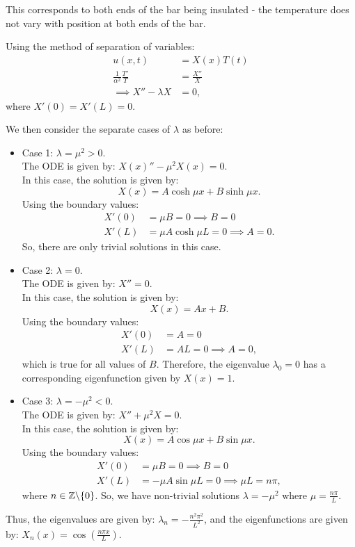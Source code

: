 This corresponds to both ends of the bar being insulated - the temperature does not vary with position at both ends of the bar.

Using the method of separation of variables:
\begin{align*}
	u(x,t) &= X(x) T(t) \\
	\frac{1}{\alpha^2} \frac{T'}{T} &= \frac{X''}{X} \\
	\implies X'' - \lambda X &= 0,
\end{align*}
where $X'(0) = X'(L) = 0$.

We then consider the separate cases of $\lambda$ as before:
\begin{itemize}
	\item Case 1: $\lambda = \mu^2 > 0$.\\
	The ODE is given by: $X(x)'' - \mu^2 X(x) = 0$.\\
	In this case, the solution is given by:
	\[
	X(x) = A \cosh{\mu x} + B \sinh{\mu x}.
	\]
	Using the boundary values:
	\begin{align*}
		X'(0) &= \mu B = 0 \implies B=0 \\
		X'(L) &= \mu A \cosh{\mu L} = 0 \implies A=0.
	\end{align*}
	So, there are only trivial solutions in this case.
	
	\item Case 2: $\lambda = 0$.\\
	The ODE is given by: $X''= 0$.\\
	In this case, the solution is given by:
	\[
	X(x) = Ax + B.
	\]
	Using the boundary values:
	\begin{align*}
		X'(0) &= A = 0 \\
		X'(L) &= AL = 0 \implies A = 0,
	\end{align*}
	which is true for all values of $B$. Therefore, the eigenvalue $\lambda_0 = 0$ has a corresponding eigenfunction given by $X(x) = 1$.
	
	\item Case 3: $\lambda = -\mu^2 < 0$.\\
	The ODE is given by: $X'' + \mu^2 X = 0$.\\
	In this case, the solution is given by:
	\[
	X(x) = A \cos{\mu x} + B \sin{\mu x}.
	\]
	Using the boundary values:
	\begin{align*}
		X'(0) &= \mu B = 0 \implies B = 0 \\
		X'(L) &= -\mu A \sin{\mu L} = 0 \implies \mu L = n \pi,
	\end{align*}
	where $n \in \mathbb{Z} \backslash \{0\} $. So, we have non-trivial solutions $\lambda = -\mu^2$ where $\mu = \frac{n \pi}{L}$.
\end{itemize}
Thus, the eigenvalues are given by: $\lambda_n = -\frac{n^2\pi^2}{L^2}$, and the eigenfunctions are given by: $X_n(x) = \cos{\left(\frac{n \pi x}{L} \right)}$.


